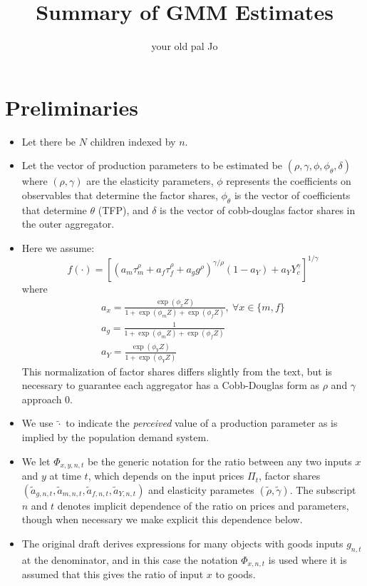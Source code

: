 \documentclass{article}
\title{Summary of GMM Estimates}
\author{your old pal Jo}
\begin{document}
\maketitle
\section*{Preliminaries}
\begin{itemize}
    \item Let there be $N$ children indexed by $n$.
    \item Let the vector of production parameters to be estimated be $(\rho,\gamma,\phi,\phi_{\theta},\delta)$ where $(\rho,\gamma)$ are the elasticity parameters, $\phi$ represents the coefficients on observables that determine the factor shares, $\phi_{\theta}$ is the vector of coefficients that determine $\theta$ (TFP), and $\delta$ is the vector of cobb-douglas factor shares in the outer aggregator.
    \item Here we assume:
    \[ f(\cdot) = \left[\left(a_{m}\tau_{m}^\rho+a_{f}\tau_{f}^\rho+a_{g}g^\rho\right)^{\gamma / \rho}(1-a_{Y}) + a_{Y}Y_{c}^{\gamma}\right]^{1/\gamma} \]
    where
    \begin{eqnarray}
        a_{x} = \frac{\exp(\phi_{x}Z)}{1+\exp(\phi_{m}Z)+\exp(\phi_{f}Z)},\ \forall x\in\{m,f\} \nonumber \\
        a_{g} = \frac{1}{1+\exp(\phi_{m}Z)+\exp(\phi_{f}Z)} \nonumber \\
        a_{Y} = \frac{\exp(\phi_{Y}Z)}{1+\exp(\phi_{Y}Z)} \nonumber
    \end{eqnarray}
    This normalization of factor shares differs slightly from the text, but is necessary to guarantee each aggregator has a Cobb-Douglas form as $\rho$ and $\gamma$ approach 0.
    \item We use $\tilde{\cdot}$ to indicate the \emph{perceived} value of a production parameter as is implied by the population demand system.
    \item We let $\Phi_{x,y,n,t}$ be the generic notation for the ratio between any two inputs $x$ and $y$ at time $t$, which depends on the input prices $\Pi_{t}$, factor shares $(\tilde{a}_{g,n,t},\tilde{a}_{m,n,t},\tilde{a}_{f,n,t},\tilde{a}_{Y,n,t})$ and elasticity parametes $(\tilde{\rho},\tilde{\gamma})$. The subscript $n$ and $t$ denotes implicit dependence of the ratio on prices and parameters, though when necessary we make explicit this dependence below.
    \item The original draft derives expressions for many objects with goods inputs $g_{n,t}$ at the denominator, and in this case the notation $\Phi_{x,n,t}$ is used where it is assumed that this gives the ratio of input $x$ to goods.
\end{itemize}
\end{document}
